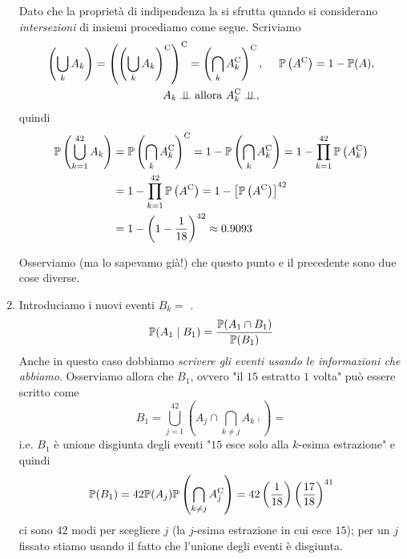 \begin{enumerate}
	Dato che la proprietà di indipendenza la si sfrutta quando si considerano \textit{intersezioni} di insiemi procediamo come segue. Scriviamo
	\begin{gather*}
		\left(\bigcup _{k} A_{k}\right) =\left(\left(\bigcup _{k} A_{k}\right)^{\mathrm{C}}\right)^{\mathrm{C}} =\left(\bigcap _{k} A_{k}^{\mathrm{C}}\right)^{\mathrm{C}} ,\ \ \ \ \mathbb{P}\left(A^{\mathrm{C}}\right) =1-\mathbb{P}(A) ,\\
		A_{k} \perp \!\!\! \perp \text{allora} \ A_{k}^{\mathrm{C}} \perp \!\!\! \perp ,
	\end{gather*}
	quindi
	\begin{align*}
		\mathbb{P}\left(\bigcup _{k=1}^{42} A_{k}\right) & =\mathbb{P}\left(\bigcap _{k} A_{k}^{\mathrm{C}}\right)^{\mathrm{C}} =1-\mathbb{P}\left(\bigcap _{k} A_{k}^{\mathrm{C}}\right) =1-\prod _{k=1}^{42}\mathbb{P}\left(A_{k}^{\mathrm{C}}\right)\\
		 & =1-\prod _{k=1}^{42}\mathbb{P}\left(A^{\mathrm{C}}\right) =1-\left[\mathbb{P}\left(A^{\mathrm{C}}\right)\right]^{42}\\
		 & =1-\left(1-\frac{1}{18}\right)^{42} \approx 0.9093
	\end{align*}

	\begin{oss}
		Osserviamo (ma lo sapevamo già!) che questo punto e il precedente sono due cose diverse.
	\end{oss}
	\item Introduciamo i nuovi eventi $B_{k} =$ .
	\begin{equation*}
		\mathbb{P}(A_{1} \mid B_{1}) =\frac{\mathbb{P}(A_{1} \cap B_{1})}{\mathbb{P}(B_{1})}
	\end{equation*}
	Anche in questo caso dobbiamo \textit{scrivere gli eventi usando le informazioni che abbiamo}. Osserviamo allora che $B_{1}$, ovvero "il $15$ estratto $1$ volta" può essere scritto come
	\begin{equation*}
		B_{1} =\bigcup _{j=1}^{42}\left(A_{j} \cap \bigcap _{k\neq j} A_{k}\comp\right) =
	\end{equation*}
	i.e. $B_{1}$ è unione disgiunta degli eventi "$15$ esce solo alla $k$-esima estrazione" e quindi
	\begin{equation*}
		\mathbb{P}(B_{1}) =42\mathbb{P}(A_{j})\mathbb{P}\left(\bigcap _{k\neq j} A_{j}^{\mathrm{C}}\right) =42\left(\frac{1}{18}\right)\left(\frac{17}{18}\right)^{41}
	\end{equation*}
	ci sono $42$ modi per scegliere $j$ (la $j$-esima estrazione in cui esce $15$); per un $j$ fissato stiamo usando il fatto che l'unione degli eventi è disgiunta.


\end{enumerate}
